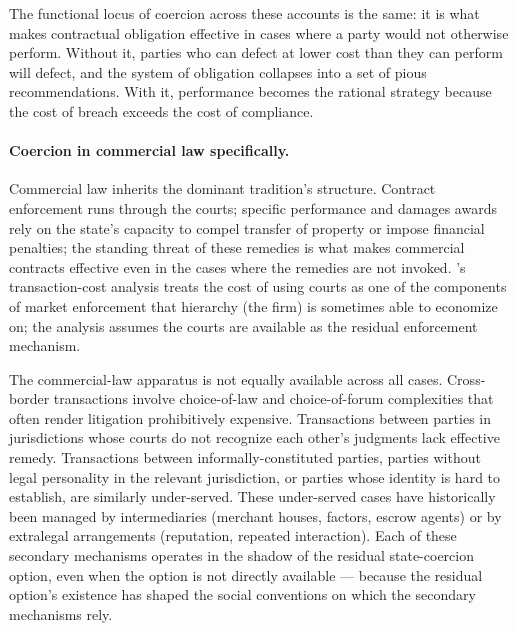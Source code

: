 \documentclass[11pt,a4paper]{article}
\theoremstyle{remark}
\begin{document}
The functional locus of coercion across these accounts is the
same: it is what makes contractual obligation effective in cases
where a party would not otherwise perform. Without it, parties
who can defect at lower cost than they can perform will defect,
and the system of obligation collapses into a set of pious
recommendations. With it, performance becomes the rational
strategy because the cost of breach exceeds the cost of
compliance.

\paragraph{Coercion in commercial law specifically.}
Commercial law inherits the dominant tradition's structure.
Contract enforcement runs through the courts; specific
performance and damages awards rely on the state's capacity to
compel transfer of property or impose financial penalties; the
standing threat of these remedies is what makes commercial
contracts effective even in the cases where the remedies are
not invoked. \citet{williamson1985}'s transaction-cost analysis
treats the cost of using courts as one of the components of
market enforcement that hierarchy (the firm) is sometimes able
to economize on; the analysis assumes the courts are available as
the residual enforcement mechanism.

The commercial-law apparatus is not equally available across all
cases. Cross-border transactions involve choice-of-law and
choice-of-forum complexities that often render litigation
prohibitively expensive. Transactions between parties in
jurisdictions whose courts do not recognize each other's
judgments lack effective remedy. Transactions between
informally-constituted parties, parties without legal personality
in the relevant jurisdiction, or parties whose identity is hard
to establish, are similarly under-served. These under-served
cases have historically been managed by intermediaries
(merchant houses, factors, escrow agents) or by extralegal
arrangements (reputation, repeated interaction). Each of these
secondary mechanisms operates in the shadow of the residual
state-coercion option, even when the option is not directly
available --- because the residual option's existence has
shaped the social conventions on which the secondary mechanisms
rely.
\end{document}
